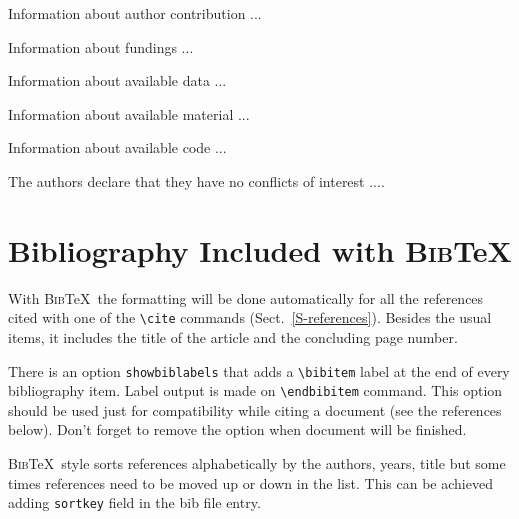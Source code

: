 \documentclass[namedreferences,hyperref,optionalrh]{spr-sola}
\newcommand{\BibTeX}{\textsc{Bib}\TeX}
\begin{document}
 
\begin{authorcontribution}
Information about author contribution ...
\end{authorcontribution}

\begin{fundinginformation}
Information about fundings ...
\end{fundinginformation}

\begin{dataavailability}
Information about available data ...
\end{dataavailability}

\begin{materialsavailability}
Information about available material ...
\end{materialsavailability}

\begin{codeavailability}
Information about available code ...
\end{codeavailability}

\begin{ethics}
\begin{conflict}
The authors declare that they have no conflicts of interest ....
\end{conflict}
\end{ethics}
  
  
\section*{Bibliography Included with \BibTeX } 
  With \BibTeX\ the formatting will be done automatically for all 
the references cited with one
of the \verb+\cite+ commands (Sect.~\ref{S-references}).
Besides the usual items, it includes the title of the article 
and the concluding page number. 
   
There is an option \texttt{showbiblabels} that adds a \verb+\bibitem+ 
label at the end of every bibliography item. Label output is made on \verb+\endbibitem+ command.
This option should be used 
just for compatibility while citing a document (see the references below). 
Don't forget to remove the option when document will be finished.

\BibTeX\ style sorts references alphabetically by the authors, years, title but some times references
need to be moved up or down in the list. This can be achieved adding \verb+sortkey+ field in the bib file entry.
\end{document}
